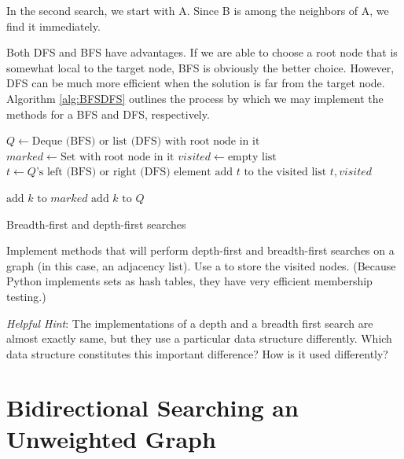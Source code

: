 In the second search, we start with A.
Since B is among the neighbors of A, we find it immediately.

Both DFS and BFS have advantages.
If we are able to choose a root node that is somewhat local to the target node, BFS is obviously the better choice. However,
DFS can be much more efficient when the solution is far from the target node.
Algorithm \ref{alg:BFSDFS} outlines the process by which we may implement the methods for a BFS and DFS, respectively.

\begin{algorithm}
\begin{algorithmic}[1]
	\State $Q \gets \text{Deque (BFS) or list (DFS) with root node in it}$	
	\State $marked \gets \text{Set with root node in it}$	
	\State $visited \gets \text{empty list}$	
							
		\State $t \gets Q\text{'s left (BFS) or right (DFS) element}$	
		\State $\text{add }t \text{ to the visited list}$
									
			\State {} $t,visited$
		
		\Else										{}
					\State $\text{add } k \text{ to } marked$
					\State $\text{add } k \text{ to } Q$
				\EndIf
			\EndFor
		\EndIf
	\EndWhile
\EndProcedure
\end{algorithmic}
\caption{Breadth-first and depth-first searches}
\label{alg:BFSDFS}
\end{algorithm}

\begin{problem}
Implement methods that will perform depth-first and breadth-first searches on a graph
(in this case, an adjacency list). Use a  to store the visited nodes.
(Because Python implements sets as hash tables, they have very efficient membership
testing.)

\emph{Helpful Hint}: The implementations of a depth and a breadth first search
are almost exactly same, but they use a particular data structure differently.
Which data structure constitutes this important difference? How is it used differently?
\end{problem}

\section*{Bidirectional Searching an Unweighted Graph}

